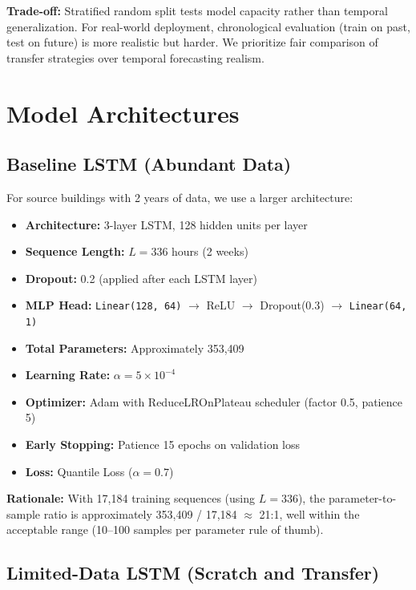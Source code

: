 \documentclass[12pt,a4paper]{report}
\begin{document}
\textbf{Trade-off:} Stratified random split tests model capacity rather than temporal generalization. For real-world deployment, chronological evaluation (train on past, test on future) is more realistic but harder. We prioritize fair comparison of transfer strategies over temporal forecasting realism.

\section{Model Architectures}

\subsection{Baseline LSTM (Abundant Data)}

For source buildings with 2 years of data, we use a larger architecture:

\begin{itemize}
    \item \textbf{Architecture:} 3-layer LSTM, 128 hidden units per layer
    \item \textbf{Sequence Length:} \(L = 336\) hours (2 weeks)
    \item \textbf{Dropout:} 0.2 (applied after each LSTM layer)
    \item \textbf{MLP Head:} \texttt{Linear(128, 64)} $\to$ ReLU $\to$ Dropout(0.3) $\to$ \texttt{Linear(64, 1)}
    \item \textbf{Total Parameters:} Approximately 353,409
    \item \textbf{Learning Rate:} \(\alpha = 5 \times 10^{-4}\)
    \item \textbf{Optimizer:} Adam with ReduceLROnPlateau scheduler (factor 0.5, patience 5)
    \item \textbf{Early Stopping:} Patience 15 epochs on validation loss
    \item \textbf{Loss:} Quantile Loss (\(\alpha=0.7\))
\end{itemize}

\textbf{Rationale:} With 17,184 training sequences (using \(L=336\)), the parameter-to-sample ratio is approximately 353,409 / 17,184 $\approx$ 21:1, well within the acceptable range (10--100 samples per parameter rule of thumb).

\subsection{Limited-Data LSTM (Scratch and Transfer)}
\end{document}
